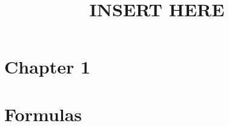 \documentclass[12pt,a4paper]{article}
\title{INSERT HERE}
\date{}
\begin{document}
\maketitle

\tableofcontents

\section{Chapter 1}



\section{Formulas}

\end{document}
